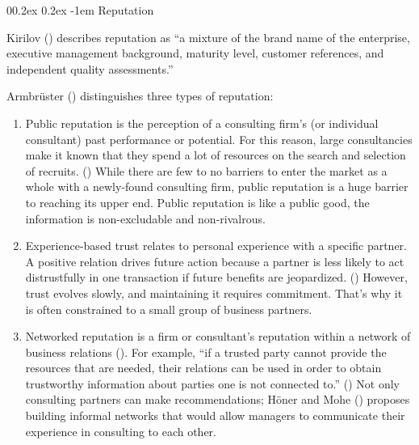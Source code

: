 \documentclass[
  man,floatsintext]{apa6}
\makeatletter
\providecommand{\tightlist}{%
  \setlength{\itemsep}{0pt}\setlength{\parskip}{0pt}}
\let\oldparagraph\paragraph
\renewcommand{\paragraph}[1]{\oldparagraph{#1}\mbox{}}
\renewcommand{\paragraph}{\@startsection{paragraph}{4}{\parindent}%
  {0\baselineskip \@plus 0.2ex \@minus 0.2ex}%
  {-1em}%
  {\normalfont\normalsize\bfseries\itshape\typesectitle}}
\makeatother
\begin{document}
\paragraph{Reputation}\label{reputation}

Kirilov () describes reputation as ``a mixture of the brand name of the enterprise, executive management background, maturity level, customer references, and independent quality assessments.''

Armbrüster () distinguishes three types of reputation:

\begin{enumerate}
\def\labelenumi{\arabic{enumi}.}
\tightlist
\item
  Public reputation is the perception of a consulting firm's (or individual consultant) past performance or potential. For this reason, large consultancies make it known that they spend a lot of resources on the search and selection of recruits. () While there are few to no barriers to enter the market as a whole with a newly-found consulting firm, public reputation is a huge barrier to reaching its upper end. Public reputation is like a public good, the information is non-excludable and non-rivalrous.
\item
  Experience-based trust relates to personal experience with a specific partner. A positive relation drives future action because a partner is less likely to act distrustfully in one transaction if future benefits are jeopardized. () However, trust evolves slowly, and maintaining it requires commitment. That's why it is often constrained to a small group of business partners.
\item
  Networked reputation is a firm or consultant's reputation within a network of business relations (). For example, ``if a trusted party cannot provide the resources that are needed, their relations can be used in order to obtain trustworthy information about parties one is not connected to.'' () Not only consulting partners can make recommendations; Höner and Mohe () proposes building informal networks that would allow managers to communicate their experience in consulting to each other.
\end{enumerate}
\end{document}
